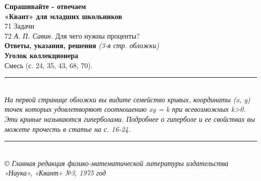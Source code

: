  \textbf{Спрашивайте - отвечаем}\\
\newline
\hspace*{3ex}\textbf{«Квант» для младших школьников}\\
71 Задачи\\
72 \textit{А. П. Савин.} Для чего нужны проценты?\\
 \textbf{Ответы, указания, решения} \textit{(3-я стр. обложки)}\\
\newline
\hspace*{3ex}\textbf{Уголок коллекционера}\\
\hspace*{3ex}Смесь (с. 24, 35, 43, 68, 70).
\begin{spacing}{0.7}
\noindent\rule{9.5cm}{0.4pt}\\
\textit{
На первой странице обложки вы видите семейство кривых, координаты (x, y) точек которых удовлетворяют соотношению xy = k при всевозможных k>0. Эти кривые называются гиперболами. Подробнее о гиперболе и ее свойствах вы можете прочесть в статье на с. 16-24.}\\
\rule{9.5cm}{0.4pt}\\
\textit{
\copyright \hspace*{1ex} Главная редакция физико-математической литературы издательства «Наука», «Квант» №3, 1975 год}
\end{spacing}